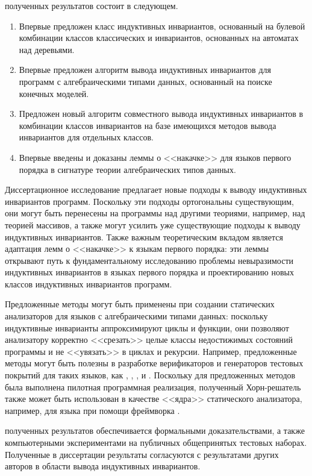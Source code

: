 {\novelty{} полученных результатов состоит в следующем.}
\begin{enumerate}[beginpenalty=10000] %
  \item Впервые предложен класс индуктивных инвариантов, основанный на булевой комбинации классов классических и инвариантов, основанных на автоматах над деревьями.
  \item Впервые предложен алгоритм вывода индуктивных инвариантов для программ с алгебраическими типами данных, основанный на поиске конечных моделей.
  \item Предложен новый алгоритм совместного вывода индуктивных инвариантов в комбинации классов инвариантов на базе имеющихся методов вывода инвариантов для отдельных классов.
  \item Впервые введены и доказаны леммы о <<накачке>> для языков первого порядка в сигнатуре теории алгебраических типов данных.
\end{enumerate}

{\influenceTh}
Диссертационное исследование предлагает новые подходы к выводу индуктивных инвариантов программ. Поскольку эти подходы ортогональны существующим, они могут быть перенесены на программы над другими теориями, например, над теорией массивов, а также могут усилить уже существующие подходы к выводу индуктивных инвариантов. Также важным теоретическим вкладом является адаптация лемм о <<накачке>> к языкам первого порядка: эти леммы открывают путь к фундаментальному исследованию проблемы невыразимости индуктивных инвариантов в языках первого порядка и проектированию новых классов индуктивных инвариантов программ.

{\influencePr}
Предложенные методы могут быть применены при создании статических анализаторов для языков с алгебраическими типами данных: поскольку индуктивные инварианты аппроксимируют циклы и функции, они позволяют анализатору корректно <<срезать>> целые классы недостижимых состояний программы и не <<увязать>> в циклах и рекурсии.
Например, предложенные методы могут быть полезны в разработке верификаторов и генераторов тестовых покрытий для таких языков, как \rust{}, \scala{}, \solidity{}, \haskell{} и \ocaml{}.
Поскольку для предложенных методов была выполнена пилотная программная реализация, полученный Хорн-решатель также может быть использован в качестве <<ядра>> статического анализатора, например, для языка \rust{} при помощи фреймворка \rustHorn{}.

{\reliability} полученных результатов обеспечивается формальными доказательствами, а также компьютерными экспериментами на публичных общепринятых тестовых наборах.
Полученные в диссертации результаты согласуются с результатами других авторов в области вывода индуктивных инвариантов.

